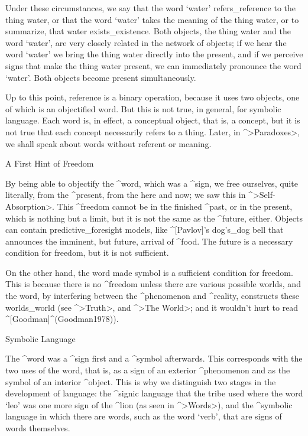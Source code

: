 Under these circumstances, we say that the word `water'
refers_{reference} to the thing water, or that the word `water' takes
the meaning of the thing water, or to summarize, that water
exists_{existence}. Both objects, the thing water and the word `water',
are very closely related in the network of objects; if we hear the word
`water' we bring the thing water directly into the present, and if we
perceive signs that make the thing water present, we can immediately
pronounce the word `water'. Both objects become present simultaneously.

Up to this point, reference is a binary operation, because it uses two
objects, one of which is an objectified word. But this is not true, in
general, for symbolic language. Each word is, in effect, a conceptual
object, that is, a concept, but it is not true that each concept
necessarily refers to a thing. Later, in ^>Paradoxes>, we shall speak
about words without referent or meaning.


\Section A First Hint of Freedom

By being able to objectify the ^{word}, which was a ^{sign}, we free
ourselves, quite literally, from the ^{present}, from the here and now;
we saw this in ^>Self-Absorption>. This ^{freedom} cannot be in the
finished ^{past}, or in the present, which is nothing but a limit, but
it is not the same as the ^{future}, either. Objects can contain
predictive_{foresight} models, like ^[Pavlov]'s dog's_{dog} bell that
announces the imminent, but future, arrival of ^{food}. The future is a
necessary condition for freedom, but it is not sufficient.

On the other hand, the word made symbol is a sufficient condition for
freedom. This is because there is no ^{freedom} unless there are various
possible worlds, and the word, by interfering between the ^{phenomenon}
and ^{reality}, constructs these worlds_{world} (see ^>Truth>, and ^>The
World>; and it wouldn't hurt to read ^[Goodman]^(Goodman1978)).


\Section Symbolic Language

The ^{word} was a ^{sign} first and a ^{symbol} afterwards. This
corresponds with the two uses of the word, that is, as a sign of an
exterior ^{phenomenon} and as the symbol of an interior ^{object}. This
is why we distinguish two stages in the development of language: the
^{signic language} that the tribe used where the word `leo' was one more
sign of the ^{lion} (as seen in ^>Words>), and the ^{symbolic language}
in which there are words, such as the word `verb', that are signs of
words themselves.

